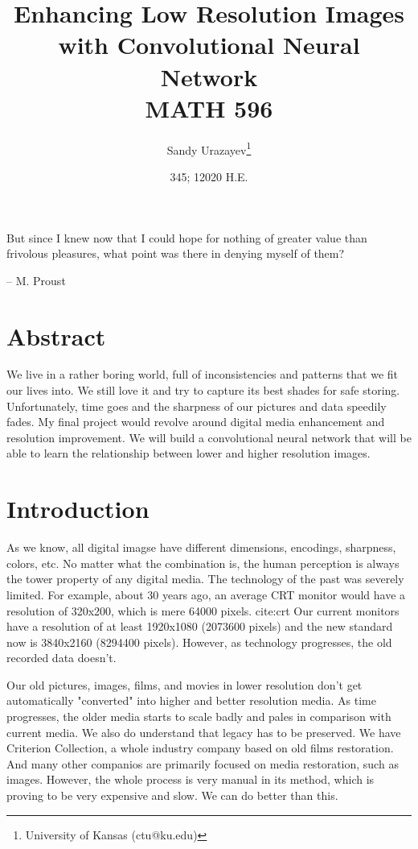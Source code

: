 \documentclass[12pt]{article}
\author{Sandy Urazayev\thanks{University of Kansas (ctu@ku.edu)}}
\date{345; 12020 H.E.}
\title{Enhancing Low Resolution Images with Convolutional Neural Network\\\medskip
\large MATH 596}
\begin{document}
\maketitle
\begin{flushleft}
But since I knew now that I could hope for nothing of greater value than
frivolous pleasures, what point was there in denying myself of them?
\end{flushleft}

\begin{flushright}
-- M. Proust
\end{flushright}

\section*{Abstract}
\label{sec:orgac8a8bf}
We live in a rather boring world, full of inconsistencies and patterns that we
fit our lives into. We still love it and try to capture its best shades for safe
storing. Unfortunately, time goes and the sharpness of our pictures and data
speedily fades. My final project would revolve around digital media enhancement
and resolution improvement. We will build a convolutional neural network that
will be able to learn the relationship between lower and higher resolution images.

\section*{Introduction}
\label{sec:org0291d68}
As we know, all digital imagse have different dimensions, encodings, sharpness,
colors, etc. No matter what the combination is, the human perception is always the
tower property of any digital media. The technology of the past was severely limited.
For example, about 30 years ago, an average CRT monitor would have a resolution of
320x200, which is mere 64000 pixels. cite:crt Our current monitors have a resolution
of at least 1920x1080 (2073600 pixels) and the new standard now is 3840x2160
(8294400 pixels). However, as technology progresses, the old recorded data doesn't.

Our old pictures, images, films, and movies in lower resolution don't get automatically
"converted" into higher and better resolution media. As time progresses, the older
media starts to scale badly and pales in comparison with current media. We also do
understand that legacy has to be preserved. We have Criterion Collection, a whole
industry company based on old films restoration. And many other companios are primarily
focused on media restoration, such as images. However, the whole process is very manual
in its method, which is proving to be very expensive and slow. We can do better than
this.
\end{document}
